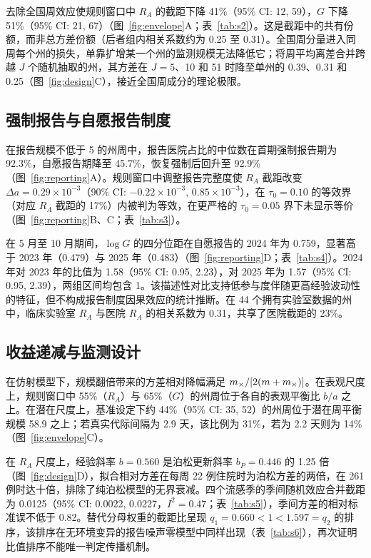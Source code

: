 去除全国周效应使规则窗口中 $R_A$ 的截距下降 41\%（95\% CI: 12, 59），$G$ 下降 51\%（95\% CI: 21, 67）（图~\ref{fig:envelope}A；表~\ref{tab:s2}）。这是截距中的共有份额，而非总方差份额（后者组内相关系数约为 0.25 至 0.31）。全国周分量进入同周每个州的损失，单靠扩增某一个州的监测规模无法降低它；将周平均离差合并跨越 $J$ 个随机抽取的州，其方差在 $J=5$、10 和 51 时降至单州的 0.39、0.31 和 0.25（图~\ref{fig:design}C），接近全国周成分的理论极限。

\subsection{强制报告与自愿报告制度}
\label{sec:res-reporting}

在报告规模不低于 5 的州周中，报告医院占比的中位数在首期强制报告期为 92.3\%，自愿报告期降至 45.7\%，恢复强制后回升至 92.9\%（图~\ref{fig:reporting}A）。规则窗口中调整报告完整度使 $R_A$ 截距改变 $\Delta a = 0.29\times10^{-3}$（90\% CI: $-0.22\times10^{-3}$, $0.85\times10^{-3}$），在 $\tau_0=0.10$ 的等效界（对应 $R_A$ 截距的 17\%）内被判为等效，在更严格的 $\tau_0=0.05$ 界下未显示等价（图~\ref{fig:reporting}B、C；表~\ref{tab:s3}）。

在 5 月至 10 月期间，$\log G$ 的四分位距在自愿报告的 2024 年为 0.759，显著高于 2023 年（0.479）与 2025 年（0.483）（图~\ref{fig:reporting}D；表~\ref{tab:s4}）。2024 年对 2023 年的比值为 1.58（95\% CI: 0.95, 2.23），对 2025 年为 1.57（95\% CI: 0.95, 2.39），两组区间均包含 1。该描述性对比支持低参与度伴随更高经验波动性的特征，但不构成报告制度因果效应的统计推断。在 44 个拥有实验室数据的州中，临床实验室 $R_A$ 与医院 $R_A$ 的相关系数为 0.31，共享了医院截距的 23\%。

\subsection{收益递减与监测设计}
\label{sec:res-design}

在仿射模型下，规模翻倍带来的方差相对降幅满足 $m_{\times}/[2(m+m_{\times})]$。在表观尺度上，规则窗口中 55\%（$R_A$）与 65\%（$G$）的州周位于各自的表观平衡比 $b/a$ 之上。在潜在尺度上，基准设定下约 44\%（95\% CI: 35, 52）的州周位于潜在周平衡规模 58.9 之上；若真实代际间隔为 2.9 天，该比例为 31\%，若为 2.2 天则为 14\%（图~\ref{fig:envelope}C）。

在 $R_A$ 尺度上，经验斜率 $b=0.560$ 是泊松更新斜率 $b_P=0.446$ 的 1.25 倍（图~\ref{fig:design}D），拟合相对方差在每周 22 例住院时为泊松方差的两倍，在 261 例时达十倍，排除了纯泊松模型的无界衰减。四个流感季的季间随机效应合并截距为 0.0125（95\% CI: 0.0022, 0.0227，$I^2=0.47$；表~\ref{tab:s5}），季间方差的相对标准误不低于 0.82。替代分母权重的截距比呈现 $q_1=0.660<1<1.597=q_2$ 的排序，该排序在无环境变异的报告噪声零模型中同样出现（表~\ref{tab:s6}），再次证明比值排序不能唯一判定传播机制。
